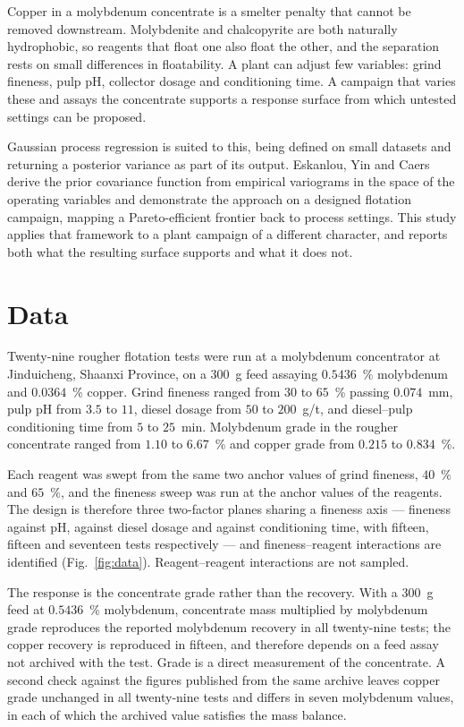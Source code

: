 \documentclass[final,11pt,nopreprintline]{elsarticle}
\begin{document}
Copper in a molybdenum concentrate is a smelter penalty that cannot be
removed downstream. Molybdenite and chalcopyrite are both naturally
hydrophobic, so reagents that float one also float the other, and the
separation rests on small differences in floatability. A plant can
adjust few variables: grind fineness, pulp pH, collector dosage and
conditioning time. A campaign that varies these and assays the
concentrate supports a response surface from which untested settings can
be proposed.

Gaussian process regression is suited to this, being defined on small
datasets and returning a posterior variance as part of its output.
Eskanlou, Yin and Caers derive the prior covariance function from
empirical variograms in the space of the operating variables and
demonstrate the approach on a designed flotation campaign, mapping a
Pareto-efficient frontier back to process settings. This study applies
that framework to a plant campaign of a different character, and reports
both what the resulting surface supports and what it does not.

\section{Data}
\label{sec:data}

Twenty-nine rougher flotation tests were run at a molybdenum
concentrator at Jinduicheng, Shaanxi Province, on a $300$~g feed
assaying $0.5436$~\% molybdenum and $0.0364$~\% copper. Grind fineness
ranged from $30$ to $65$~\% passing $0.074$~mm, pulp pH from $3.5$ to
$11$, diesel dosage from $50$ to $200$~g/t, and diesel--pulp
conditioning time from $5$ to $25$~min. Molybdenum grade in the rougher
concentrate ranged from $1.10$ to $6.67$~\% and copper grade from
$0.215$ to $0.834$~\%.

Each reagent was swept from the same two anchor values of grind
fineness, $40$~\% and $65$~\%, and the fineness sweep was run at the
anchor values of the reagents. The design is therefore three two-factor
planes sharing a fineness axis --- fineness against pH, against diesel
dosage and against conditioning time, with fifteen, fifteen and
seventeen tests respectively --- and fineness--reagent interactions are
identified (Fig.~\ref{fig:data}). Reagent--reagent interactions are not
sampled.

The response is the concentrate grade rather than the recovery. With a
$300$~g feed at $0.5436$~\% molybdenum, concentrate mass multiplied by
molybdenum grade reproduces the reported molybdenum recovery in all
twenty-nine tests; the copper recovery is reproduced in fifteen, and
therefore depends on a feed assay not archived with the test. Grade is a
direct measurement of the concentrate. A second check against the
figures published from the same archive leaves copper grade unchanged in
all twenty-nine tests and differs in seven molybdenum values, in each of
which the archived value satisfies the mass balance.
\end{document}
